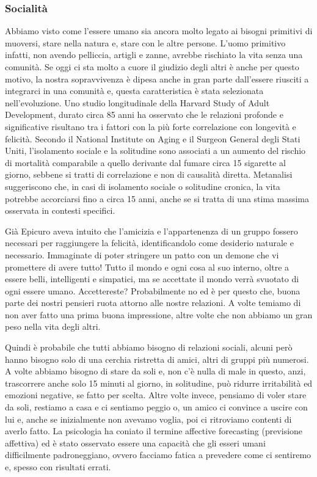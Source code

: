 \documentclass[12pt]{book} %
\begin{document}
\subsubsection{Socialità}
Abbiamo visto come l'essere umano sia ancora molto legato ai bisogni primitivi di muoversi, stare nella natura e, stare con
le altre persone. L'uomo primitivo infatti, non avendo pelliccia, artigli e zanne, avrebbe rischiato la vita senza una comunità. Se oggi ci sta molto a cuore il giudizio degli altri è anche per questo motivo, la nostra
sopravvivenza è dipesa anche in gran parte dall'essere riusciti a integrarci in una comunità e, questa caratteristica è stata selezionata nell'evoluzione. 
Uno studio longitudinale della Harvard Study of Adult Development, durato circa 85 anni ha osservato che le relazioni profonde e significative risultano tra i fattori con la più forte correlazione con longevità e felicità.
Secondo il National Institute on Aging e il Surgeon General degli Stati Uniti, l’isolamento sociale e la solitudine sono associati a un aumento del rischio di mortalità comparabile a quello derivante dal fumare circa 15 sigarette al giorno, sebbene si tratti di correlazione e non di causalità diretta. Metanalisi suggeriscono che, in casi di isolamento sociale o solitudine cronica, la vita potrebbe accorciarsi fino a circa 15 anni, anche se si tratta di una stima massima osservata in contesti specifici.

Già Epicuro aveva intuito che l'amicizia e l'appartenenza di un gruppo fossero
necessari per raggiungere la felicità, identificandolo come desiderio naturale e necessario. 
Immaginate di poter stringere un patto con un demone che vi promettere di avere tutto! Tutto il mondo e ogni cosa al suo interno,
oltre a essere belli, intelligenti e simpatici, ma se accettate il mondo verrà svuotato di ogni essere umano.
Accettereste? Probabilmente no ed è per questo che, buona parte dei nostri pensieri ruota attorno alle nostre relazioni.
A volte temiamo di non aver fatto una prima buona impressione, altre volte che non abbiamo un gran peso nella vita
degli altri.

Quindi è probabile che tutti abbiamo bisogno di relazioni sociali, alcuni però hanno bisogno solo di una cerchia ristretta di amici,
altri di gruppi più numerosi. A volte abbiamo bisogno di stare da
soli e, non c'è nulla di male in questo, anzi, trascorrere anche solo
15 minuti al giorno, in solitudine, può ridurre irritabilità ed emozioni negative, se fatto per scelta. Altre volte invece,
pensiamo di voler stare da soli, restiamo a casa e ci sentiamo peggio o, un amico ci convince a uscire con lui e, anche
se inizialmente non avevamo voglia, poi ci ritroviamo contenti di averlo fatto. La psicologia ha coniato il termine affective
forecasting (previsione affettiva) ed è stato osservato essere una capacità che gli esseri umani difficilmente
padroneggiano, ovvero facciamo fatica a prevedere come ci sentiremo e, spesso con risultati errati.
\end{document}
